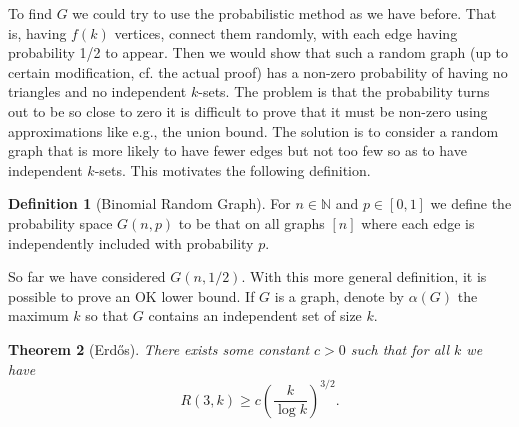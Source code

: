 \documentclass{report}
\theoremstyle{definition}
\theoremstyle{plain}
\newtheorem{thm}{Theorem}
\theoremstyle{definition}
\newtheorem{defn}[thm]{Definition}
\begin{document}
	To find $G$ we could try to use the probabilistic method as we have before. That is, having $f(k)$ vertices, connect them randomly, with each edge having probability 1/2 to appear. Then we would show that such a random graph (up to certain modification, cf. the actual proof) has a non-zero probability of having no triangles and no independent $k$-sets.  The problem is that the probability turns out to be so close to zero it is difficult to prove that it must be non-zero using approximations like e.g., the union bound. The solution is to consider a random graph that is more likely to have fewer edges but not too few so as to have independent $k$-sets. This motivates the following definition.
	\begin{defn}[Binomial Random Graph]
		For $n\in\mathbb{N}$ and $p\in[0,1]$ we define the probability space $G(n,p)$ to be that on all graphs $[n]$ where each edge is independently included with probability $p$.
	\end{defn}
	So far we have considered $G(n,1/2)$. With this more general definition, it is possible to prove an OK lower bound. If $G$ is a graph, denote by $\alpha(G)$ the maximum $k$ so that $G$ contains an independent set of size $k$.
	\begin{thm}[Erd\H{o}s]
		There exists some constant $c>0$ such that for all $k$ we have
		\[
			R(3,k) \geq c\left(\frac{k}{\log k}\right)^{3/2}.
		\]
	\end{thm}
\end{document}

